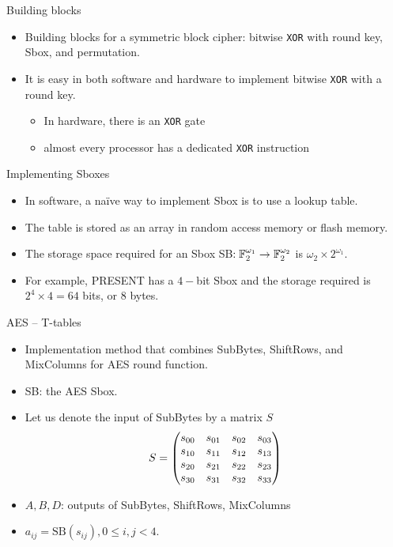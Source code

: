 \begin{frame}{Building blocks}
    \begin{itemize}
        \item Building blocks for a symmetric block cipher: bitwise \texttt{XOR} with round key, Sbox, and permutation.
        \item It is easy in both software and hardware to implement bitwise \texttt{XOR} with a round key.
        \begin{itemize}
            \item In hardware, there is an \texttt{XOR} gate 
            \item almost every processor has a dedicated \texttt{XOR} instruction
        \end{itemize}
    \end{itemize}
\end{frame}

\begin{frame}{Implementing Sboxes}
    \begin{itemize}
        \item In software, a na\"ive way to implement Sbox is to use a lookup table. 
        \item The table is stored as an array in random access memory or flash memory.
        \item The storage space required for an Sbox SB$:{\mathbb F}_2^{\omega_1}\to{\mathbb F}_2^{\omega_2}$ is $\omega_2\times2^{\omega_1}$.
       \item For example, PRESENT has a $4-$bit Sbox and the storage required is $2^4\times4=64$ bits, or $8$ bytes.
    \end{itemize}
\end{frame}

\begin{frame}{AES -- T-tables}
    \begin{itemize}
        \item Implementation method that combines SubBytes, ShiftRows, and MixColumns for AES round function.
        \item SB: the AES Sbox.
        \item Let us denote the input of SubBytes by a matrix $S$
    \[
    S=
    \begin{pmatrix}
    s_{00} & s_{01} & s_{02} & s_{03}\\
    s_{10} & s_{11} & s_{12} & s_{13}\\
    s_{20} & s_{21} & s_{22} & s_{23}\\
    s_{30} & s_{31} & s_{32} & s_{33}
    \end{pmatrix}
    \vspace*{-0.2cm}
    \]
    \item $A, B, D$: outputs of SubBytes, ShiftRows, MixColumns
    \item $a_{ij}=\text{SB}(s_{ij}), 0\leq i,j<4$.
    \end{itemize}
\end{frame}

